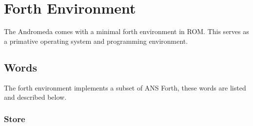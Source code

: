\section{Forth Environment}\label{sec:forth-environment}
The Andromeda comes with a minimal forth environment in ROM.
This serves as a primative operating system and programming environment.

\subsection{Words}\label{subsec:implemented-words}
The forth environment implements a subset of ANS Forth, these words are listed
and described below.
\subsubsection{Store}